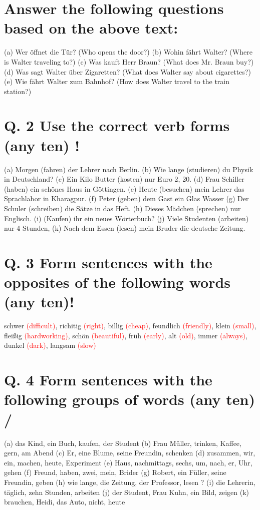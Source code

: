 \documentclass{article}
\begin{document}
\section*{Answer the following questions based on the above text:}
(a) Wer öffnet die Tür? (Who opens the door?)
(b) Wohin fährt Walter? (Where is Walter traveling to?)
(c) Was kauft Herr Braun? (What does Mr. Braun buy?)
(d) Was sagt Walter über Zigaretten? (What does Walter say about cigarettes?)
(e) Wie fährt Walter zum Bahnhof? (How does Walter travel to the train station?)
\section*{Q. 2 Use the correct verb forms (any ten) !}
(a) Morgen (fahren) der Lehrer nach Berlin.
(b) Wie lange (studieren) du Physik in Deutschland?
(c) Ein Kilo Butter (kosten) nur Euro 2, 20.
(d) Frau Schiller (haben) ein schönes Haus in Göttingen.
(e) Heute (besuchen) mein Lehrer das Sprachlabor in Kharagpur.
(f) Peter (geben) dem Gast ein Glas Wasser
(g) Der Schuler (schreiben) die Sätze in das Heft.
(h) Dieses Mädchen (sprechen) nur Englisch.
(i) (Kaufen) ihr ein neues Wörterbuch?
(j) Viele Studenten (arbeiten) nur 4 Stunden,
(k) Nach dem Essen (lesen) mein Bruder die deutsche Zeitung.
\section*{Q. 3 Form sentences with the opposites of the following words (any ten)!}
schwer \textcolor{red}{(difficult)}, richitig \textcolor{red}{(right)}, billig \textcolor{red}{(cheap)}, feundlich \textcolor{red}{(friendly)}, klein \textcolor{red}{(small)}, fleißig \textcolor{red}{(hardworking)}, schön \textcolor{red}{(beautiful)}, früh \textcolor{red}{(early)}, alt \textcolor{red}{(old)}, immer \textcolor{red}{(always)}, dunkel \textcolor{red}{(dark)}, langsam \textcolor{red}{(slow)}
\section*{Q. 4 Form sentences with the following groups of words (any ten) /}
(a) das Kind, ein Buch, kaufen, der Student
(b) Frau Müller, trinken, Kaffee, gern, am Abend
(c) Er, eine Blume, seine Freundin, schenken
(d) zusammen, wir, ein, machen, heute, Experiment
(e) Haus, nachmittags, sechs, um, nach, er, Uhr, gehen
(f) Freund, haben, zwei, mein, Brider
(g) Robert, ein Füller, seine Freundin, geben
(h) wie lange, die Zeitung, der Professor, lesen ?
(i) die Lehrerin, täglich, zehn Stunden, arbeiten
(j) der Student, Frau Kuhn, ein Bild, zeigen
(k) brauchen, Heidi, das Auto, nicht, heute
\end{document}
